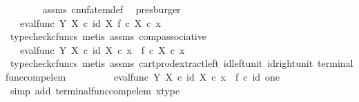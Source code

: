 \begin{isabellebody}
\ \ \ \ \ \ \isamarkupfalse%
\ assms\ cnufatem{\isacharunderscore}{\kern0pt}def{}\ \isamarkupfalse%
\ presburger\isanewline
\ \ \ \ \isamarkupfalse%
\ \isamarkupfalse%
\ {\isachardoublequoteopen}{\isachardot}{\kern0pt}{\isachardot}{\kern0pt}{\isachardot}{\kern0pt}\ {\isacharequal}{\kern0pt}\ eval{\isacharunderscore}{\kern0pt}func\ Y\ X\ {\isasymcirc}\isactrlsub c\ {\isasymlangle}id\ X{\isacharcomma}{\kern0pt}\ f\ {\isasymcirc}\isactrlsub c\ {\isasymbeta}\isactrlbsub X\isactrlesub {\isasymrangle}\ {\isasymcirc}\isactrlsub c\ x{\isachardoublequoteclose}\isanewline
\ \ \ \ \ \ \isamarkupfalse%
\ {\isacharparenleft}{\kern0pt}typecheck{\isacharunderscore}{\kern0pt}cfuncs{\isacharcomma}{\kern0pt}\ metis\ assms\ comp{\isacharunderscore}{\kern0pt}associative{}{\isacharparenright}{\kern0pt}\isanewline
\ \ \ \ \isamarkupfalse%
\ \isamarkupfalse%
\ {\isachardoublequoteopen}{\isachardot}{\kern0pt}{\isachardot}{\kern0pt}{\isachardot}{\kern0pt}\ {\isacharequal}{\kern0pt}\ eval{\isacharunderscore}{\kern0pt}func\ Y\ X\ {\isasymcirc}\isactrlsub c\ {\isasymlangle}id\ X\ {\isasymcirc}\isactrlsub c\ x\ {\isacharcomma}{\kern0pt}\ f\ {\isasymcirc}\isactrlsub c\ {\isacharparenleft}{\kern0pt}{\isasymbeta}\isactrlbsub X\isactrlesub \ {\isasymcirc}\isactrlsub c\ x{\isacharparenright}{\kern0pt}{\isasymrangle}{\isachardoublequoteclose}\isanewline
\ \ \ \ \ \ \isamarkupfalse%
\ {\isacharparenleft}{\kern0pt}typecheck{\isacharunderscore}{\kern0pt}cfuncs{\isacharcomma}{\kern0pt}\ metis\ assms\ cart{\isacharunderscore}{\kern0pt}prod{\isacharunderscore}{\kern0pt}extract{\isacharunderscore}{\kern0pt}left\ id{\isacharunderscore}{\kern0pt}left{\isacharunderscore}{\kern0pt}unit{}\ id{\isacharunderscore}{\kern0pt}right{\isacharunderscore}{\kern0pt}unit{}\ terminal{\isacharunderscore}{\kern0pt}func{\isacharunderscore}{\kern0pt}comp{\isacharunderscore}{\kern0pt}elem{\isacharparenright}{\kern0pt}\isanewline
\ \ \ \ \isamarkupfalse%
\ \isamarkupfalse%
\ {\isachardoublequoteopen}{\isachardot}{\kern0pt}{\isachardot}{\kern0pt}{\isachardot}{\kern0pt}\ {\isacharequal}{\kern0pt}\ eval{\isacharunderscore}{\kern0pt}func\ Y\ X\ {\isasymcirc}\isactrlsub c\ {\isasymlangle}id\ X\ {\isasymcirc}\isactrlsub c\ x\ {\isacharcomma}{\kern0pt}\ f\ {\isasymcirc}\isactrlsub c\ id\ one{\isasymrangle}{\isachardoublequoteclose}\isanewline
\ \ \ \ \ \ \isamarkupfalse%
\ {\isacharparenleft}{\kern0pt}simp\ add{\isacharcolon}{\kern0pt}\ terminal{\isacharunderscore}{\kern0pt}func{\isacharunderscore}{\kern0pt}comp{\isacharunderscore}{\kern0pt}elem\ x{\isacharunderscore}{\kern0pt}type{\isacharparenright}{\kern0pt}\isanewline

\end{isabellebody}
